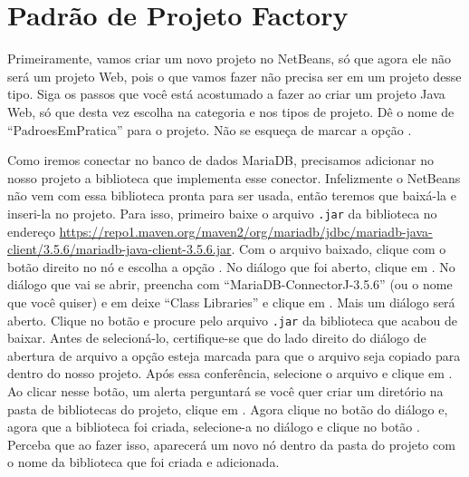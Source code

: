 \section{Padrão de Projeto Factory}

Primeiramente, vamos criar um novo projeto no NetBeans, só que agora ele não será um projeto Web, pois o que vamos fazer não precisa ser em um projeto desse tipo. Siga os passos que você está acostumado a fazer ao criar um projeto Java Web, só que desta vez escolha  na categoria e  nos tipos de projeto. Dê o nome de ``PadroesEmPratica'' para o projeto. Não se esqueça de marcar a opção .

Como iremos conectar no banco de dados MariaDB, precisamos adicionar no nosso projeto a biblioteca que implementa esse conector. Infelizmente o NetBeans não vem com essa biblioteca pronta para ser usada, então teremos que baixá-la e inseri-la no projeto. Para isso, primeiro baixe o arquivo \texttt{.jar} da biblioteca no endereço \url{https://repo1.maven.org/maven2/org/mariadb/jdbc/mariadb-java-client/3.5.6/mariadb-java-client-3.5.6.jar}. Com o arquivo baixado, clique com o botão direito no nó  e escolha a opção . No diálogo que foi aberto, clique em . No diálogo que vai se abrir, preencha  com ``MariaDB-ConnectorJ-3.5.6'' (ou o nome que você quiser) e em  deixe ``Class Libraries'' e clique em . Mais um diálogo será aberto. Clique no botão  e procure pelo arquivo \texttt{.jar} da biblioteca que acabou de baixar. Antes de selecioná-lo, certifique-se que do lado direito do diálogo de abertura de arquivo a opção  esteja marcada para que o arquivo seja copiado para dentro do nosso projeto. Após essa conferência, selecione o arquivo e clique em . Ao clicar nesse botão, um alerta perguntará se você quer criar um diretório na pasta de bibliotecas do projeto, clique em . Agora clique no botão  do diálogo  e, agora que a biblioteca foi criada, selecione-a no diálogo  e clique no botão . Perceba que ao fazer isso, aparecerá um novo nó dentro da pasta  do projeto com o nome da biblioteca que foi criada e adicionada.

